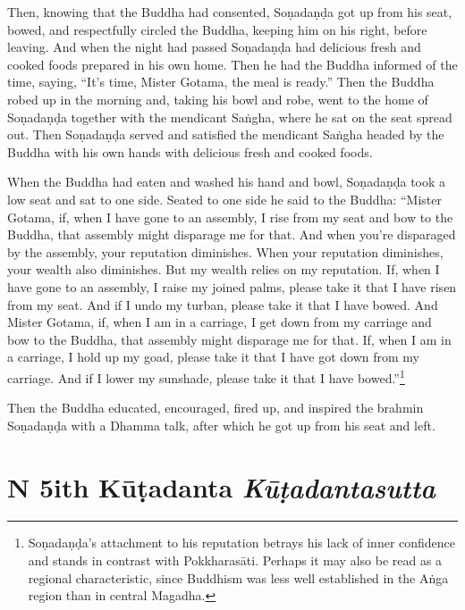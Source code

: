 \documentclass[12pt,openany]{book}%
\newcommand*{\suttatitleacronym}[1]{\smaller[2]{#1}\vspace*{.3em}}
\newcommand*{\suttatitletranslation}[1]{\linebreak{#1}}
\newcommand*{\suttatitleroot}[1]{\linebreak\smaller[2]\itshape{#1}}
\newcommand*{\tocacronym}[1]{\hspace*{-3.3em}{#1}\quad}
\newcommand*{\toctranslation}[1]{#1}
\newcommand*{\tocroot}[1]{(\textit{#1})}
\renewcommand*{\tocacronym}[1]{\hspace*{0em}{#1}\quad}%
\begin{document}
Then, knowing that the Buddha had consented, \textsanskrit{Soṇadaṇḍa} got up from his seat, bowed, and respectfully circled the Buddha, keeping him on his right, before leaving. And when the night had passed \textsanskrit{Soṇadaṇḍa} had delicious fresh and cooked foods prepared in his own home. Then he had the Buddha informed of the time, saying, “It’s time, Mister Gotama, the meal is ready.” Then the Buddha robed up in the morning and, taking his bowl and robe, went to the home of \textsanskrit{Soṇadaṇḍa} together with the mendicant \textsanskrit{Saṅgha}, where he sat on the seat spread out. Then \textsanskrit{Soṇadaṇḍa} served and satisfied the mendicant \textsanskrit{Saṅgha} headed by the Buddha with his own hands with delicious fresh and cooked foods. 

When the Buddha had eaten and washed his hand and bowl, \textsanskrit{Soṇadaṇḍa} took a low seat and sat to one side. Seated to one side he said to the Buddha: “Mister Gotama, if, when I have gone to an assembly, I rise from my seat and bow to the Buddha, that assembly might disparage me for that. And when you’re disparaged by the assembly, your reputation diminishes. When your reputation diminishes, your wealth also diminishes. But my wealth relies on my reputation. If, when I have gone to an assembly, I raise my joined palms, please take it that I have risen from my seat. And if I undo my turban, please take it that I have bowed. And Mister Gotama, if, when I am in a carriage, I get down from my carriage and bow to the Buddha, that assembly might disparage me for that. If, when I am in a carriage, I hold up my goad, please take it that I have got down from my carriage. And if I lower my sunshade, please take it that I have bowed.”\footnote{\textsanskrit{Soṇadaṇḍa}’s attachment to his reputation betrays his lack of inner confidence and stands in contrast with \textsanskrit{Pokkharasāti}. Perhaps it may also be read as a regional characteristic, since Buddhism  was less well established in the \textsanskrit{Aṅga} region than in central Magadha. } 

Then the Buddha educated, encouraged, fired up, and inspired the brahmin \textsanskrit{Soṇadaṇḍa} with a Dhamma talk, after which he got up from his seat and left. 

%
\chapter*{{\suttatitleacronym DN 5}{\suttatitletranslation With Kūṭadanta }{\suttatitleroot Kūṭadantasutta}}
\addcontentsline{toc}{chapter}{\tocacronym{DN 5} \toctranslation{With Kūṭadanta } \tocroot{Kūṭadantasutta}}
\end{document}
